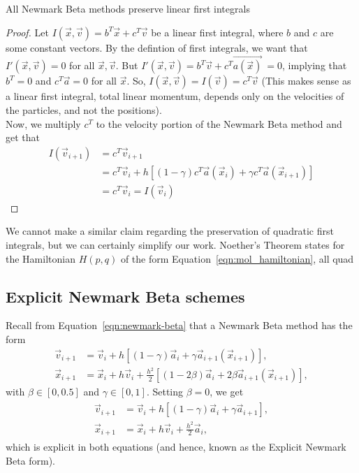 \documentclass[../Main.tex]{subfiles}
\begin{document}
\begin{claim} All Newmark Beta methods preserve linear first integrals \end{claim}
\begin{proof}
Let $I(\vec{x}, \vec{v}) = b^{T}\vec{x} + c^{T}\vec{v}$ be a linear first integral, where $b$ and $c$ are some constant vectors.
By the defintion of first integrals, we want that $I'(\vec{x}, \vec{v})= 0$ for all $\vec{x}, \vec{v}$.
But $I'(\vec{x}, \vec{v}) = b^{T}\vec{v} + c^{T}\vec{a(\vec{x})}\ = 0$, implying that $b^{T} = 0$ and $c^{T}\vec{a} = 0$ for all $\vec{x}$. So, $I(\vec{x}, \vec{v}) = I(\vec{v}) = c^{T}\vec{v}$ (This makes sense as a linear first integral, total linear momentum, depends only on the velocities of the particles, and not the positions).\\
Now, we multiply $c^{T}$ to the velocity portion of the Newmark Beta method and get that
\begin{align*}
I\left(\vec{v}_{i+1}\right) &= c^{T}\vec{v}_{i+1} \\
&= c^{T}\vec{v}_{i} + h\left[\left(1-\gamma\right)c^{T}\vec{a}(\vec{x}_{i}) + \gamma c^{T}\vec{a}(\vec{x}_{i+1})\right] \\
&= c^{T}\vec{v}_{i} = I\left(\vec{v}_{i}\right)
\end{align*} 
\end{proof}

We cannot make a similar claim regarding the preservation of quadratic first integrals, but we can certainly simplify our work. Noether's Theorem states for the Hamiltonian $H(p, q)$ of the form Equation~\ref{eqn:mol_hamiltonian}, all quad

\subsection{Explicit Newmark Beta schemes}

Recall from Equation~\ref{eqn:newmark-beta} that a Newmark Beta method has the form
\begin{align*}
		\vec{v}_{i+1} & = \vec{v}_{i} + h\left[\left(1-\gamma\right)\vec{a}_{i} + \gamma\vec{a}_{i+1}\left(\vec{x}_{i+1}\right)\right], \\
		\vec{x}_{i+1} & = \vec{x}_{i} + h\vec{v}_{i} + \frac{h^2}{2}\left[\left(1-2\beta \right)\vec{a}_{i} + 2\beta\vec{a}_{i+1}\left(\vec{x}_{i+1}\right)\right], 
\end{align*}with $\beta \in \left[0,0.5\right]$ and $\gamma \in \left[0,1\right]$.
Setting $\beta = 0$, we get
\begin{align}
	\begin{split}
		\vec{v}_{i+1} & = \vec{v}_{i} + h\left[\left(1-\gamma\right)\vec{a}_{i} + \gamma\vec{a}_{i+1}\right], \\
		\vec{x}_{i+1} & = \vec{x}_{i} + h\vec{v}_{i} + \frac{h^2}{2}\vec{a}_{i},
	\end{split} \label{explicit_newmark-beta}  
\end{align}
which is explicit in both equations (and hence, known as the Explicit Newmark Beta form).
\end{document}
